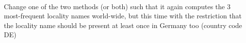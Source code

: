  \\
Change one of the two methods (or both) such that it again computes the 3
most-frequent locality names world-wide, but this time with the restriction
that the locality name should be present at least once in Germany too
(country code DE)